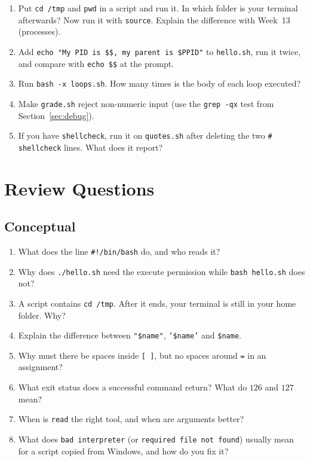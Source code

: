 \documentclass[11pt,a4paper]{article}
\newcommand{\cmd}[1]{\texttt{#1}}
\begin{document}
\begin{tryit}
\begin{enumerate}[leftmargin=1.4em]
  \item Put \texttt{cd /tmp} and \texttt{pwd} in a script and run it. In which folder is your terminal afterwards? Now run it with \cmd{source}. Explain the difference with Week~13 (processes).
  \item Add \texttt{echo "My PID is \$\$, my parent is \$PPID"} to \texttt{hello.sh}, run it twice, and compare with \cmd{echo \$\$} at the prompt.
  \item Run \cmd{bash -x loops.sh}. How many times is the body of each loop executed?
  \item Make \texttt{grade.sh} reject non-numeric input (use the \cmd{grep -qx} test from Section~\ref{sec:debug}).
  \item If you have \cmd{shellcheck}, run it on \texttt{quotes.sh} after deleting the two \texttt{\# shellcheck} lines. What does it report?
\end{enumerate}
\end{tryit}

\section{Review Questions}

\subsection*{Conceptual}
\begin{enumerate}[leftmargin=1.6em]
  \item What does the line \texttt{\#!/bin/bash} do, and who reads it?
  \item Why does \texttt{./hello.sh} need the execute permission while \texttt{bash hello.sh} does not?
  \item A script contains \texttt{cd /tmp}. After it ends, your terminal is still in your home folder. Why?
  \item Explain the difference between \texttt{"\$name"}, \texttt{'\$name'} and \texttt{\$name}.
  \item Why must there be spaces inside \texttt{[ ]}, but no spaces around \texttt{=} in an assignment?
  \item What exit status does a successful command return? What do $126$ and $127$ mean?
  \item When is \texttt{read} the right tool, and when are arguments better?
  \item What does \texttt{bad interpreter} (or \texttt{required file not found}) usually mean for a script copied from Windows, and how do you fix it?
\end{enumerate}
\end{document}
